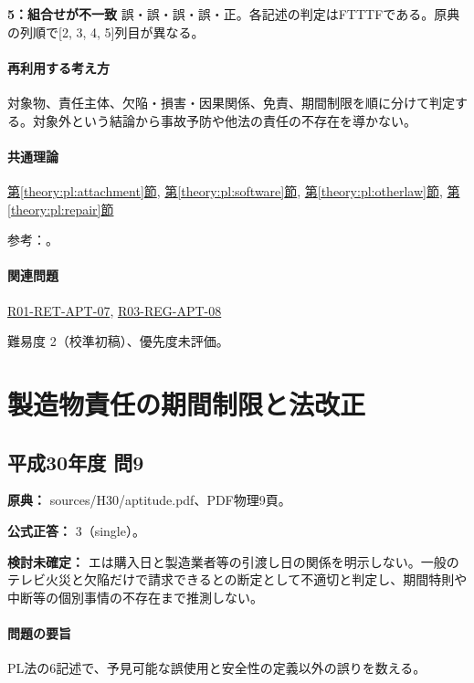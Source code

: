 \noindent\textbf{5：組合せが不一致} 誤・誤・誤・誤・正。各記述の判定はFTTTFである。原典の列順で[2, 3, 4, 5]列目が異なる。\par

\paragraph{再利用する考え方} 対象物、責任主体、欠陥・損害・因果関係、免責、期間制限を順に分けて判定する。対象外という結論から事故予防や他法の責任の不存在を導かない。

\paragraph{共通理論} \hyperref[theory:pl:attachment]{第\ref*{theory:pl:attachment}節}, \hyperref[theory:pl:software]{第\ref*{theory:pl:software}節}, \hyperref[theory:pl:otherlaw]{第\ref*{theory:pl:otherlaw}節}, \hyperref[theory:pl:repair]{第\ref*{theory:pl:repair}節}

\par 参考：\cite{pl_statute,pl_qa,pl_definitions2018,pl_nuclear_statute}。

\paragraph{関連問題} \hyperref[q:r01-ret-apt-07]{R01-RET-APT-07}, \hyperref[q:r03-reg-apt-08]{R03-REG-APT-08}

\par 難易度 2（校準初稿）、優先度未評価。

\section{製造物責任の期間制限と法改正}

\subsection{平成30年度 問9}
\label{q:h30-reg-apt-09}

\noindent\textbf{原典：} sources/H30/aptitude.pdf、PDF物理9頁。

\textbf{公式正答：} 3（single）。

\par\textbf{検討未確定：} エは購入日と製造業者等の引渡し日の関係を明示しない。一般のテレビ火災と欠陥だけで請求できるとの断定として不適切と判定し、期間特則や中断等の個別事情の不存在まで推測しない。

\paragraph{問題の要旨} PL法の6記述で、予見可能な誤使用と安全性の定義以外の誤りを数える。

